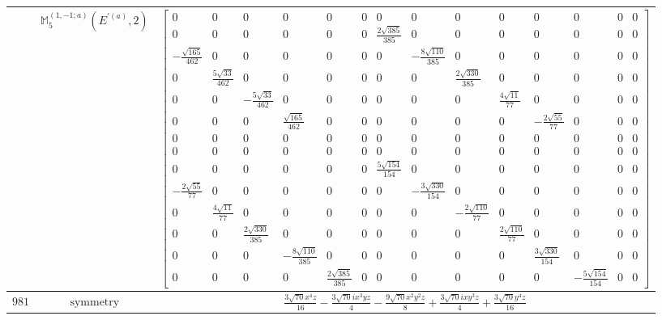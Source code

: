 \documentclass[fleqn,8pt,landscape]{jsarticle}
\begin{document}
\begin{longtable}{ccc}
$  $ & $ \mathbb{M}_{5}^{(1,-1;a)}(E^{\prime(a)},2) $ & $ \begin{bmatrix} 0 & 0 & 0 & 0 & 0 & 0 & 0 & 0 & 0 & 0 & 0 & 0 & 0 & 0 \\ 0 & 0 & 0 & 0 & 0 & 0 & \frac{2 \sqrt{385}}{385} & 0 & 0 & 0 & 0 & 0 & 0 & 0 \\ - \frac{\sqrt{165}}{462} & 0 & 0 & 0 & 0 & 0 & 0 & - \frac{8 \sqrt{110}}{385} & 0 & 0 & 0 & 0 & 0 & 0 \\ 0 & \frac{5 \sqrt{33}}{462} & 0 & 0 & 0 & 0 & 0 & 0 & \frac{2 \sqrt{330}}{385} & 0 & 0 & 0 & 0 & 0 \\ 0 & 0 & - \frac{5 \sqrt{33}}{462} & 0 & 0 & 0 & 0 & 0 & 0 & \frac{4 \sqrt{11}}{77} & 0 & 0 & 0 & 0 \\ 0 & 0 & 0 & \frac{\sqrt{165}}{462} & 0 & 0 & 0 & 0 & 0 & 0 & - \frac{2 \sqrt{55}}{77} & 0 & 0 & 0 \\ 0 & 0 & 0 & 0 & 0 & 0 & 0 & 0 & 0 & 0 & 0 & 0 & 0 & 0 \\ 0 & 0 & 0 & 0 & 0 & 0 & 0 & 0 & 0 & 0 & 0 & 0 & 0 & 0 \\ 0 & 0 & 0 & 0 & 0 & 0 & \frac{5 \sqrt{154}}{154} & 0 & 0 & 0 & 0 & 0 & 0 & 0 \\ - \frac{2 \sqrt{55}}{77} & 0 & 0 & 0 & 0 & 0 & 0 & - \frac{3 \sqrt{330}}{154} & 0 & 0 & 0 & 0 & 0 & 0 \\ 0 & \frac{4 \sqrt{11}}{77} & 0 & 0 & 0 & 0 & 0 & 0 & - \frac{2 \sqrt{110}}{77} & 0 & 0 & 0 & 0 & 0 \\ 0 & 0 & \frac{2 \sqrt{330}}{385} & 0 & 0 & 0 & 0 & 0 & 0 & \frac{2 \sqrt{110}}{77} & 0 & 0 & 0 & 0 \\ 0 & 0 & 0 & - \frac{8 \sqrt{110}}{385} & 0 & 0 & 0 & 0 & 0 & 0 & \frac{3 \sqrt{330}}{154} & 0 & 0 & 0 \\ 0 & 0 & 0 & 0 & \frac{2 \sqrt{385}}{385} & 0 & 0 & 0 & 0 & 0 & 0 & - \frac{5 \sqrt{154}}{154} & 0 & 0 \end{bmatrix} $ \\ \hline
$ 981 $ & $ \text{symmetry} $ & $ \frac{3 \sqrt{70} x^{4} z}{16} - \frac{3 \sqrt{70} i x^{3} y z}{4} - \frac{9 \sqrt{70} x^{2} y^{2} z}{8} + \frac{3 \sqrt{70} i x y^{3} z}{4} + \frac{3 \sqrt{70} y^{4} z}{16} $ \\

\end{longtable}
\end{document}
